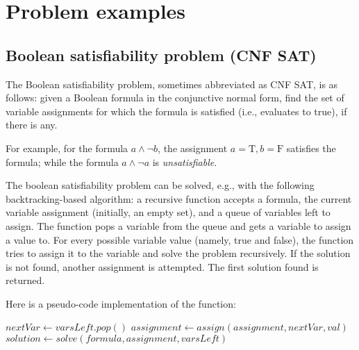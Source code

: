 \section{Problem examples}

\subsection{Boolean satisfiability problem (CNF SAT)}

The Boolean satisfiability problem, sometimes abbreviated as CNF SAT, is as follows:
given a Boolean formula in the conjunctive normal form, find the set of variable assignments
for which the formula is satisfied (i.e., evaluates to true), if there is any.

For example, for the formula $a \land \neg b$, the assignment $a=\text{T}, b=\text{F}$
satisfies the formula; while the formula $a \land \neg a$ is \emph{unsatisfiable}.

The boolean satisfiability problem can be solved, e.g., with the following backtracking-based
algorithm: a recursive function accepts a formula, the current variable assignment
(initially, an empty set), and a queue of variables left to assign. The function pops a
variable from the queue and gets a variable to assign a value to. For every possible variable
value (namely, true and false), the function tries to assign it to the variable
and solve the problem recursively. If the solution is not found, another assignment is
attempted. The first solution found is returned.

Here is a pseudo-code implementation of the function:

\begin{algorithm}
\begin{algorithmic}
        \State {}
    \EndIf

    \State

    \State $nextVar \gets varsLeft.pop()$
        \State $assignment \gets assign(assignment, nextVar, val)$
            \State $solution \gets solve(formula, assignment, varsLeft)$
                \State {}
            \EndIf
        \EndIf
    \EndFor

    \State

    \State \Return{$\varnothing$}
\EndProcedure
\end{algorithmic}
\end{algorithm}


